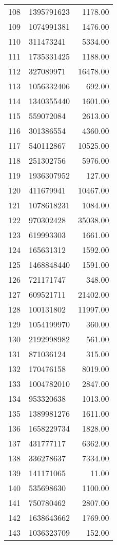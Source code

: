 \begin{table}[ht]
\begin{tabular}{rlr}
  108 & 1395791623 & 1178.00 \\ 
  109 & 1074991381 & 1476.00 \\ 
  110 & 311473241 & 5334.00 \\ 
  111 & 1735331425 & 1188.00 \\ 
  112 & 327089971 & 16478.00 \\ 
  113 & 1056332406 & 692.00 \\ 
  114 & 1340355440 & 1601.00 \\ 
  115 & 559072084 & 2613.00 \\ 
  116 & 301386554 & 4360.00 \\ 
  117 & 540112867 & 10525.00 \\ 
  118 & 251302756 & 5976.00 \\ 
  119 & 1936307952 & 127.00 \\ 
  120 & 411679941 & 10467.00 \\ 
  121 & 1078618231 & 1084.00 \\ 
  122 & 970302428 & 35038.00 \\ 
  123 & 619993303 & 1661.00 \\ 
  124 & 165631312 & 1592.00 \\ 
  125 & 1468848440 & 1591.00 \\ 
  126 & 721171747 & 348.00 \\ 
  127 & 609521711 & 21402.00 \\ 
  128 & 100131802 & 11997.00 \\ 
  129 & 1054199970 & 360.00 \\ 
  130 & 2192998982 & 561.00 \\ 
  131 & 871036124 & 315.00 \\ 
  132 & 170476158 & 8019.00 \\ 
  133 & 1004782010 & 2847.00 \\ 
  134 & 953320638 & 1013.00 \\ 
  135 & 1389981276 & 1611.00 \\ 
  136 & 1658229734 & 1828.00 \\ 
  137 & 431777117 & 6362.00 \\ 
  138 & 336278637 & 7334.00 \\ 
  139 & 141171065 & 11.00 \\ 
  140 & 535698630 & 1100.00 \\ 
  141 & 750780462 & 2807.00 \\ 
  142 & 1638643662 & 1769.00 \\ 
  143 & 1036323709 & 152.00 \\ 

\end{tabular}
\end{table}
